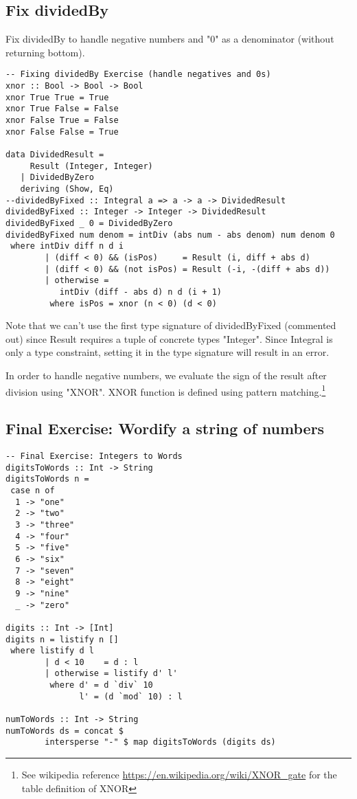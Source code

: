 \documentclass[a4paper, 11pt]{article}
\begin{document}
\subsection{Fix dividedBy}
Fix dividedBy to handle negative numbers and "0" as a denominator (without returning bottom).

\begin{lstlisting}[frame=single]
-- Fixing dividedBy Exercise (handle negatives and 0s)
xnor :: Bool -> Bool -> Bool
xnor True True = True
xnor True False = False
xnor False True = False
xnor False False = True

data DividedResult =
     Result (Integer, Integer)
   | DividedByZero
   deriving (Show, Eq)
--dividedByFixed :: Integral a => a -> a -> DividedResult
dividedByFixed :: Integer -> Integer -> DividedResult
dividedByFixed _ 0 = DividedByZero
dividedByFixed num denom = intDiv (abs num - abs denom) num denom 0
 where intDiv diff n d i
        | (diff < 0) && (isPos)     = Result (i, diff + abs d)
        | (diff < 0) && (not isPos) = Result (-i, -(diff + abs d))
        | otherwise =
           intDiv (diff - abs d) n d (i + 1)
         where isPos = xnor (n < 0) (d < 0)
\end{lstlisting}
%
Note that we can't use the first type signature of dividedByFixed (commented out) since Result requires a tuple of concrete types "Integer". Since Integral is only a type constraint, setting it in the type signature will result in an error. 

In order to handle negative numbers, we evaluate the sign of the result after division using "XNOR". XNOR function is defined using pattern matching.\footnote{See wikipedia reference \url{https://en.wikipedia.org/wiki/XNOR_gate} for the table definition of XNOR} 

\subsection{Final Exercise: Wordify a string of numbers}
\begin{lstlisting}[frame=single]
-- Final Exercise: Integers to Words
digitsToWords :: Int -> String
digitsToWords n =
 case n of
  1 -> "one"
  2 -> "two"
  3 -> "three"
  4 -> "four"
  5 -> "five"
  6 -> "six"
  7 -> "seven"
  8 -> "eight"
  9 -> "nine"
  _ -> "zero"

digits :: Int -> [Int]
digits n = listify n []
 where listify d l
        | d < 10    = d : l
        | otherwise = listify d' l'
         where d' = d `div` 10
               l' = (d `mod` 10) : l

numToWords :: Int -> String
numToWords ds = concat $
        intersperse "-" $ map digitsToWords (digits ds)
\end{lstlisting}
\end{document}
